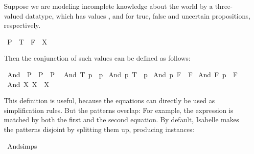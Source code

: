 \begin{isabellebody}
\begin{isamarkuptext}
  Suppose we are modeling incomplete knowledge about the world by a
  three-valued datatype, which has values , 
  and  for true, false and uncertain propositions, respectively.%
\end{isamarkuptext}%
\isamarkuptrue%
\isamarkupfalse%
\ P{}\ {}\ T\ {}\ F\ {}\ X%
\begin{isamarkuptext}%
\noindent Then the conjunction of such values can be defined as follows:%
\end{isamarkuptext}%
\isamarkuptrue%
\isamarkupfalse%
\ And\ {}{}\ {}P{}\ {}\ P{}\ {}\ P{}{}\isanewline
{}\isanewline
\ \ {}And\ T\ p\ {}\ p{}\isanewline
{}\ {}And\ p\ T\ {}\ p{}\isanewline
{}\ {}And\ p\ F\ {}\ F{}\isanewline
{}\ {}And\ F\ p\ {}\ F{}\isanewline
{}\ {}And\ X\ X\ {}\ X{}%
\begin{isamarkuptext}%
This definition is useful, because the equations can directly be used
  as simplification rules. But the patterns overlap: For example,
  the expression  is matched by both the first and
  the second equation. By default, Isabelle makes the patterns disjoint by
  splitting them up, producing instances:%
\end{isamarkuptext}%
\isamarkuptrue%
\isamarkupfalse%
\ And{}simps%
\begin{isamarkuptext}%
  

\end{isamarkuptext}
\end{isabellebody}
